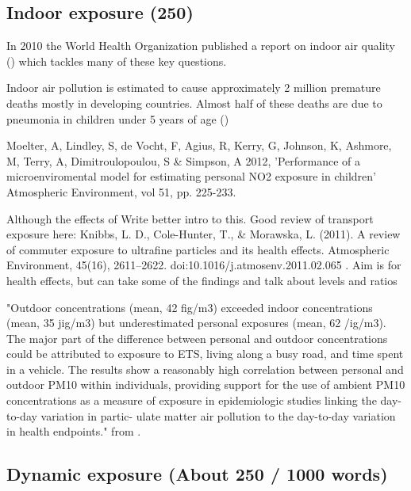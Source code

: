 
\subsection{Indoor exposure (250)}
\label{subsec:indoorexposure}

In 2010 the World Health Organization published a report on indoor air quality (\cite{WorldHealthOrganization2010}) which tackles many of these key questions.\medskip

Indoor air pollution is estimated to cause approximately 2 million premature deaths mostly in developing countries. Almost half of these deaths are due to pneumonia in children under 5 years of age (\cite{WorldHealthOrganization2011})\medskip

Moelter, A, Lindley, S, de Vocht, F, Agius, R, Kerry, G, Johnson, K, Ashmore, M, Terry, A, Dimitroulopoulou, S \& Simpson, A 2012, 'Performance of a microenviromental model for estimating personal NO2 exposure in children' Atmospheric Environment, vol 51, pp. 225-233.\medskip

Although the effects of Write better intro to this. Good review of transport exposure here: Knibbs, L. D., Cole-Hunter, T., \& Morawska, L. (2011). A review of commuter exposure to ultrafine particles and its health effects. Atmospheric Environment, 45(16), 2611–2622. doi:10.1016/j.atmosenv.2011.02.065 . Aim is for health effects, but can take some of the findings and talk about levels and ratios

"Outdoor concentrations (mean, 42 fig/m3) exceeded indoor concentrations (mean, 35 jig/m3) but underestimated personal exposures (mean, 62 /ig/m3). The major part of the difference between personal and outdoor concentrations could be attributed to exposure to ETS, living along a busy road, and time spent in a vehicle. The results show a reasonably high correlation between personal and outdoor PM10 within individuals, providing support for the use of ambient PM10 concentrations as a measure of exposure in epidemiologic studies linking the day-to-day variation in partic- ulate matter air pollution to the day-to-day variation in health endpoints." from \cite{Janssen1998}.


\subsection{Dynamic exposure (About 250 / 1000 words)}
\label{subsec:dynamicexposure}

